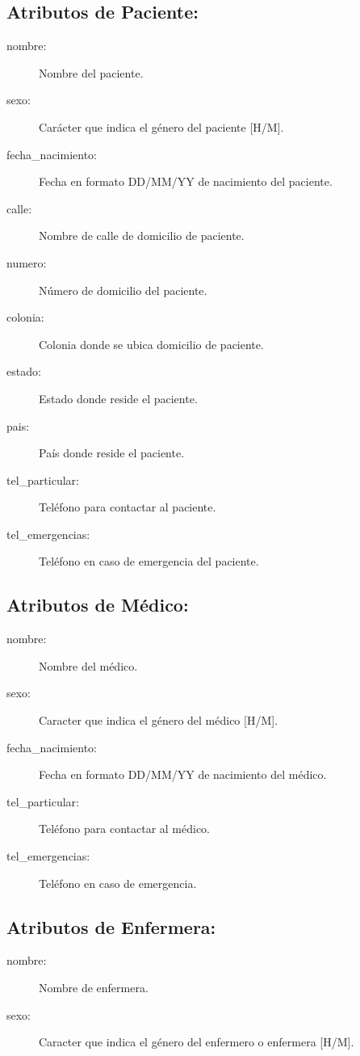 \subsection{Atributos de Paciente:}
\begin{description}
\item[nombre: ]Nombre del paciente.
\item[sexo: ]Carácter que indica el género del paciente [H/M].
\item[fecha\_nacimiento: ]Fecha en formato DD/MM/YY de nacimiento del paciente.
\item[calle: ]Nombre de calle de domicilio de paciente.
\item[numero: ]Número de domicilio del paciente.
\item[colonia: ]Colonia donde se ubica domicilio de paciente.
\item[estado: ]Estado donde reside el paciente.
\item[pais: ]País donde reside el paciente.
\item[tel\_particular: ]Teléfono para contactar al paciente.
\item[tel\_emergencias: ]Teléfono en caso de emergencia del paciente.
\end{description}

\subsection{Atributos de Médico:}
\begin{description}
\item[nombre: ]Nombre del médico.
\item[sexo: ]Caracter que indica el género del médico [H/M].
\item[fecha\_nacimiento: ]Fecha en formato DD/MM/YY de nacimiento del médico.
\item[tel\_particular: ]Teléfono para contactar al médico.
\item[tel\_emergencias: ]Teléfono en caso de emergencia.
\end{description}

\subsection{Atributos de Enfermera:}
\begin{description}
\item[nombre: ]Nombre de enfermera.
\item[sexo: ]Caracter que indica el género del enfermero o enfermera [H/M].
\end{description}

